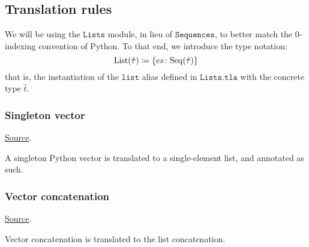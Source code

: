 \subsection{Translation rules}

We will be using the \href{https://github.com/konnov/tlaki/blob/main/src/Lists.tla}{$\texttt{Lists}$} module, in lieu of $\texttt{Sequences}$, to better match the 0-indexing convention of Python. To that end, we introduce the type notation:
\[
\List(\htau) \coloneqq \{ es\colon \Seq(\htau) \}
\]
that is, the instantiation of the $\texttt{list}$ alias defined in $\texttt{Lists.tla}$ with the concrete type $\hat{t}$.

\subsubsection{Singleton vector}
\href{https://github.com/saltiniroberto/ssf/blob/7ea6e18093d9da3154b4e396dd435549f687e6b9/high_level/common/pythonic_code_generic.py#L15-L16}{Source}.



\begin{mathpar}
\end{mathpar}
A singleton Python vector is translated to a single-element list, and annotated as such.

\subsubsection{Vector concatenation}
\href{https://github.com/saltiniroberto/ssf/blob/7ea6e18093d9da3154b4e396dd435549f687e6b9/high_level/common/pythonic_code_generic.py#L19-L20}{Source}.



\begin{mathpar}
\end{mathpar}
Vector concatenation is translated to the list concatenation.

